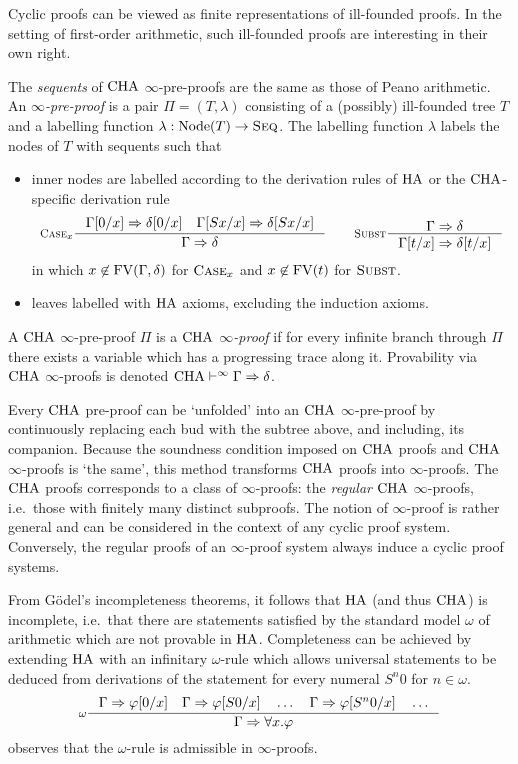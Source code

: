 Cyclic proofs can be viewed as finite representations of ill-founded proofs. In
the setting of first-order arithmetic, such ill-founded proofs are interesting
in their own right.

\begin{definition}\label{def:infty-proofs}
  The \emph{sequents} of $\mathrm{CHA}$ $\infty$-pre-proofs are the same as those of
  Peano arithmetic.
  An \emph{$\infty$-pre-proof} is a pair $\Pi = (T, \lambda)$
  consisting of a (possibly) ill-founded tree $T$
  and a labelling function $\lambda : \mathrm{Node}(T) \to \textsc{Seq}$.
  The labelling function $\lambda$ labels the nodes of $T$ with sequents such that
  \begin{itemize}
  \item
    inner nodes are labelled according to the derivation rules of $\mathrm{HA}$ or the $\mathrm{CHA}$-specific derivation rule
    \[
      \inference[$\RCase_x$]{\Gamma[0 / x] \sdash
        \delta[0 / x] \quad \Gamma[Sx / x] \sdash \delta[Sx / x]}{\Gamma \sdash \delta}
      \qquad
      \inference[$\RSubst$]{\Gamma \sdash \delta}{\Gamma[t / x] \sdash \delta[t / x]}
    \]
    in which $x \not\in \mathrm{FV}(\Gamma, \delta)$ for $\textsc{Case}_x$ and $x \not\in
    \mathrm{FV}(t)$ for $\textsc{Subst}$.
  \item
    leaves labelled with $\mathrm{HA}$ axioms,
    excluding the induction axioms.
  \end{itemize}

  A $\mathrm{CHA}$ $\infty$-pre-proof $\Pi$ is a \emph{$\mathrm{CHA}$ $\infty$-proof} if for every infinite branch
  through $\Pi$ there exists a variable which has a progressing trace along it.
  Provability via $\mathrm{CHA}$ $\infty$-proofs is denoted $\mathrm{CHA} \vdash^\infty \Gamma
  \Rightarrow \delta$.
\end{definition}

Every $\mathrm{CHA}$ pre-proof can be `unfolded' into an $\mathrm{CHA}$ $\infty$-pre-proof by
continuously replacing each bud with the subtree above, and including, its companion. Because
the soundness condition imposed on $\mathrm{CHA}$ proofs and $\mathrm{CHA}$ $\infty$-proofs is
`the same', this method transforms $\mathrm{CHA}$ proofs into $\infty$-proofs. The
$\mathrm{CHA}$ proofs corresponds to a class of $\infty$-proofs: the \emph{regular}
$\mathrm{CHA}$ $\infty$-proofs, i.e.\ those with finitely many distinct subproofs. The
notion of $\infty$-proof is rather general and can be considered in the context
of any cyclic proof system. Conversely, the regular proofs of an $\infty$-proof
system always induce a cyclic proof systems.

From Gödel's incompleteness theorems, it follows that $\mathrm{HA}$ (and
thus $\mathrm{CHA}$) is incomplete, i.e.\ that there are statements satisfied by the
standard model $\omega$ of arithmetic which are not provable in $\mathrm{HA}$.
Completeness can be achieved by extending $\mathrm{HA}$ with an infinitary $\omega$-rule which allows
universal statements to be deduced from derivations of the statement for every
numeral $S^n 0$ for $n \in \omega$.
\[
  \inference[$\omega$]{\Gamma \sdash \varphi[0 / x] \quad \Gamma \sdash
    \varphi[S0 / x] \quad \ldots \quad \Gamma \sdash \varphi[S^n 0 / x] \quad \ldots}{\Gamma \sdash \forall x. \varphi}
\]
\textcite[][Theorem 4]{simpsonCyclicArithmeticEquivalent2017} observes that the $\omega$-rule is admissible in
$\infty$-proofs.

